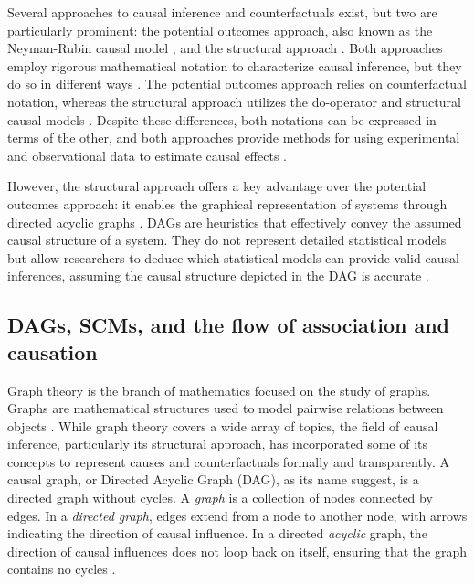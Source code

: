 \documentclass[
  authoryear,
  preprint,
  1p]{elsarticle}
\begin{document}
Several approaches to causal inference and counterfactuals exist, but
two are particularly prominent: the potential outcomes approach, also
known as the Neyman-Rubin causal model
\citep{Neyman_et_al_1923, Rubin_1974}, and the structural approach
\citep{Wright_1921, Pearl_2009, Pearl_et_al_2016}. Both approaches
employ rigorous mathematical notation to characterize causal inference,
but they do so in different ways \citep{Neal_2020}. The potential
outcomes approach relies on counterfactual notation, whereas the
structural approach utilizes the do-operator and structural causal
models \citep[SCM,][]{Pearl_2009, Pearl_et_al_2016}. Despite these
differences, both notations can be expressed in terms of the other, and
both approaches provide methods for using experimental and observational
data to estimate causal effects \citep{Pearl_2010}.

However, the structural approach offers a key advantage over the
potential outcomes approach: it enables the graphical representation of
systems through directed acyclic graphs
\citep[DAG,][]{Gross_et_al_2018, Neal_2020}. DAGs are heuristics that
effectively convey the assumed causal structure of a system. They do not
represent detailed statistical models but allow researchers to deduce
which statistical models can provide valid causal inferences, assuming
the causal structure depicted in the DAG is accurate
\citep{McElreath_2020}.

\subsection{DAGs, SCMs, and the flow of association and
causation}\label{sec-background-dag}

Graph theory is the branch of mathematics focused on the study of
graphs. Graphs are mathematical structures used to model pairwise
relations between objects \citep{Gross_et_al_2018}. While graph theory
covers a wide array of topics, the field of causal inference,
particularly its structural approach, has incorporated some of its
concepts to represent causes and counterfactuals formally and
transparently. A causal graph, or Directed Acyclic Graph (DAG), as its
name suggest, is a directed graph without cycles. A \emph{graph} is a
collection of nodes connected by edges. In a \emph{directed graph},
edges extend from a node to another node, with arrows indicating the
direction of causal influence. In a directed \emph{acyclic} graph, the
direction of causal influences does not loop back on itself, ensuring
that the graph contains no cycles \citep[@McElreath\_2020]{Neal_2020}.
\end{document}
